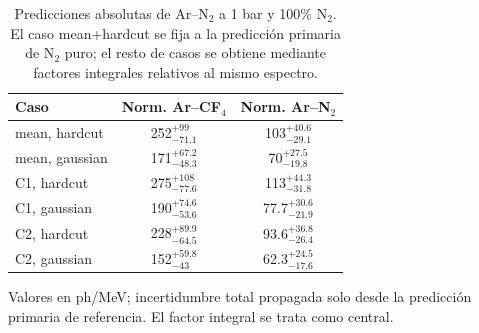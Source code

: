 \begin{table}[htbp]
\centering
\caption{Predicciones absolutas de Ar--N$_2$ a 1 bar y 100\% N$_2$. El caso mean+hardcut se fija a la predicción primaria de N$_2$ puro; el resto de casos se obtiene mediante factores integrales relativos al mismo espectro.}
\label{tab:arn2_six_cases_scaled_to_n2_mean_hardcut_primary_norms}
\begin{tabular}{lcc}
\toprule
Caso & Norm. Ar--CF$_4$ & Norm. Ar--N$_2$ \\
\midrule
mean, hardcut & \num{252}$^{+\num{99}}_{-\num{71.1}}$ & \num{103}$^{+\num{40.6}}_{-\num{29.1}}$ \\
mean, gaussian & \num{171}$^{+\num{67.2}}_{-\num{48.3}}$ & \num{70}$^{+\num{27.5}}_{-\num{19.8}}$ \\
C1, hardcut & \num{275}$^{+\num{108}}_{-\num{77.6}}$ & \num{113}$^{+\num{44.3}}_{-\num{31.8}}$ \\
C1, gaussian & \num{190}$^{+\num{74.6}}_{-\num{53.6}}$ & \num{77.7}$^{+\num{30.6}}_{-\num{21.9}}$ \\
C2, hardcut & \num{228}$^{+\num{89.9}}_{-\num{64.5}}$ & \num{93.6}$^{+\num{36.8}}_{-\num{26.4}}$ \\
C2, gaussian & \num{152}$^{+\num{59.8}}_{-\num{43}}$ & \num{62.3}$^{+\num{24.5}}_{-\num{17.6}}$ \\
\bottomrule
\end{tabular}
\par\vspace{0.35em}\footnotesize{Valores en ph/MeV; incertidumbre total propagada solo desde la predicción primaria de referencia. El factor integral se trata como central.}
\end{table}
